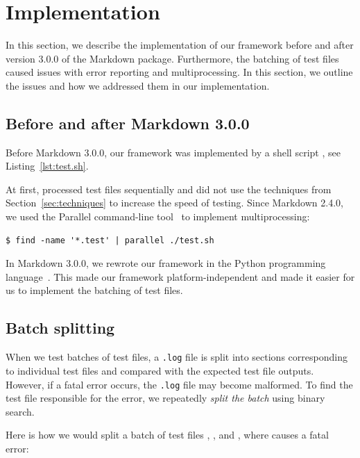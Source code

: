 \documentclass[final]{ltugboat}
\begin{document}
\section{Implementation}
\label{sec:implementation}
In this section, we describe the implementation of our framework before and after version 3.0.0 of the Markdown package. Furthermore, the batching of test files caused issues with error reporting and multiprocessing. In this section, we outline the issues and how we addressed them in our implementation.

\subsection{Before and after Markdown 3.0.0}

Before Markdown 3.0.0, our framework was implemented by a shell script , see Listing~\ref{lst:test.sh}.

At first,  processed test files sequentially and did not use the techniques from Section~\ref{sec:techniques} to increase the speed of testing. Since Markdown 2.4.0, we used the  Parallel command-line tool~\cite{tange2011gnu} to implement multiprocessing:

\begin{verbatim}
$ find -name '*.test' | parallel ./test.sh
\end{verbatim}

In Markdown 3.0.0, we rewrote our framework in the Python programming language~\cite{novotny2023implement}. This made our framework platform-independent and made it easier for us to implement the batching of test files.

\subsection{Batch splitting}

When we test batches of test files, a \texttt{.log} file is split into sections corresponding to individual test files and compared with the expected test file outputs. However, if a fatal error occurs, the \texttt{.log} file may become malformed. To find the test file responsible for the error, we repeatedly \emph{split the batch} using binary search.

Here is how we would split a batch of test files , , and , where  causes a fatal error:
\end{document}
